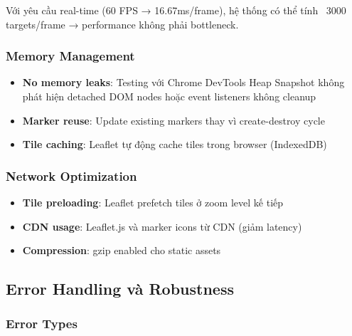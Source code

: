 Với yêu cầu real-time (60 FPS → 16.67ms/frame), hệ thống có thể tính ~3000 targets/frame → performance không phải bottleneck.

\subsubsection{Memory Management}

\begin{itemize}
    \item \textbf{No memory leaks}: Testing với Chrome DevTools Heap Snapshot không phát hiện detached DOM nodes hoặc event listeners không cleanup
    \item \textbf{Marker reuse}: Update existing markers thay vì create-destroy cycle
    \item \textbf{Tile caching}: Leaflet tự động cache tiles trong browser (IndexedDB)
\end{itemize}

\subsubsection{Network Optimization}

\begin{itemize}
    \item \textbf{Tile preloading}: Leaflet prefetch tiles ở zoom level kế tiếp
    \item \textbf{CDN usage}: Leaflet.js và marker icons từ CDN (giảm latency)
    \item \textbf{Compression}: gzip enabled cho static assets
\end{itemize}

\subsection{Error Handling và Robustness}

\subsubsection{Error Types}

